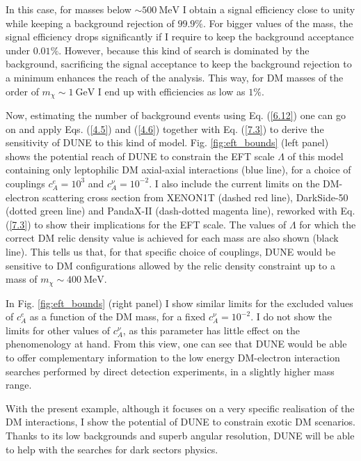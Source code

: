 In this case, for masses below $\sim 500 \ \mathrm{MeV}$ I obtain a signal efficiency close to unity while keeping a background rejection of $99.9\%$. For bigger values of the mass, the signal efficiency drops significantly if I require to keep the background acceptance under $0.01\%$. However, because this kind of search is dominated by the background, sacrificing the signal acceptance to keep the background rejection to a minimum enhances the reach of the analysis. This way, for DM masses of the order of $m_{\chi} \sim 1 \ \mathrm{GeV}$ I end up with efficiencies as low as $1\%$.

Now, estimating the number of background events using Eq. (\ref{6.12}) one can go on and apply Eqs. (\ref{4.5}) and (\ref{4.6}) together with Eq. (\ref{7.3}) to derive the sensitivity of DUNE to this kind of model. Fig. \ref{fig:eft_bounds} (left panel) shows the potential reach of DUNE to constrain the EFT scale $\Lambda$ of this model containing only leptophilic DM axial-axial interactions (blue line), for a choice of couplings $c_{A}^{e} = 10^{3}$ and $c_{A}^{\nu} = 10^{-2}$. I also include the current limits on the DM-electron scattering cross section from XENON1T \cite{XENON2019} (dashed red line), DarkSide-50 \cite{DarkSide2022} (dotted green line) and PandaX-II \cite{PandaX-II2021} (dash-dotted magenta line), reworked with Eq. (\ref{7.3}) to show their implications for the EFT scale. The values of $\Lambda$ for which the correct DM relic density value is achieved for each mass are also shown (black line). This tells us that, for that specific choice of couplings, DUNE would be sensitive to DM configurations allowed by the relic density constraint up to a mass of $m_{\chi} \sim 400 \ \mathrm{MeV}$.

In Fig. \ref{fig:eft_bounds} (right panel) I show similar limits for the excluded values of $c_{A}^{e}$ as a function of the DM mass, for a fixed $c_{A}^{\nu}=10^{-2}$. I do not show the limits for other values of $c_{A}^{\nu}$, as this parameter has little effect on the phenomenology at hand. From this view, one can see that DUNE would be able to offer complementary information to the low energy DM-electron interaction searches performed by direct detection experiments, in a slightly higher mass range.

With the present example, although it focuses on a very specific realisation of the DM interactions, I show the potential of DUNE to constrain exotic DM scenarios. Thanks to its low backgrounds and superb angular resolution, DUNE will be able to help with the searches for dark sectors physics.